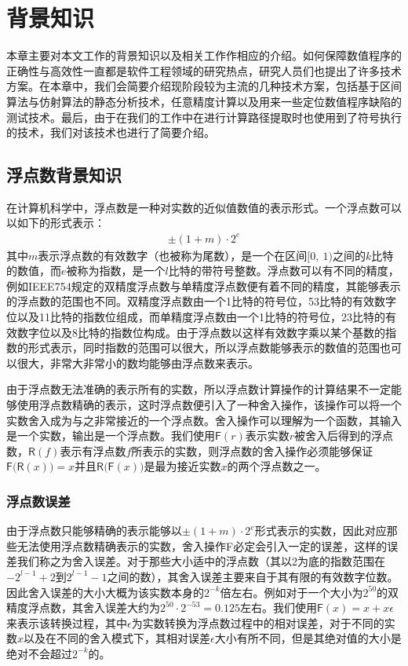 \chapter{背景知识}\label{chapter_background}

本章主要对本文工作的背景知识以及相关工作作相应的介绍。如何保障数值程序的正确性与高效性一直都是软件工程领域的研究热点，研究人员们也提出了许多技术方案。在本章中，我们会简要介绍现阶段较为主流的几种技术方案，包括基于区间算法与仿射算法的静态分析技术，任意精度计算以及用来一些定位数值程序缺陷的测试技术。最后，由于在我们的工作中在进行计算路径提取时也使用到了符号执行的技术，我们对该技术也进行了简要介绍。

\section{浮点数背景知识}

在计算机科学中，浮点数是一种对实数的近似值数值的表示形式。一个浮点数可以以如下的形式表示：
\begin{gather*}
    \pm (1+m) \cdot 2^e
\end{gather*}
其中$m$表示浮点数的有效数字（也被称为尾数），是一个在区间$[ 0 ,\ 1 )$之间的$k$比特的数值，而$e$被称为指数，是一个$l$比特的带符号整数。浮点数可以有不同的精度，例如IEEE754规定的双精度浮点数与单精度浮点数便有着不同的精度，其能够表示的浮点数的范围也不同。双精度浮点数由一个1比特的符号位，53比特的有效数字位以及11比特的指数位组成，而单精度浮点数由一个1比特的符号位，23比特的有效数字位以及8比特的指数位构成。由于浮点数以这样有效数字乘以某个基数的指数的形式表示，同时指数的范围可以很大，所以浮点数能够表示的数值的范围也可以很大，非常大非常小的数均能够由浮点数来表示。

由于浮点数无法准确的表示所有的实数，所以浮点数计算操作的计算结果不一定能够使用浮点数精确的表示，这时浮点数便引入了一种舍入操作，该操作可以将一个实数舍入成为与之非常接近的一个浮点数。舍入操作可以理解为一个函数，其输入是一个实数，输出是一个浮点数。我们使用$\mathsf{F}(r)$表示实数$r$被舍入后得到的浮点数，$\mathsf{R}(f)$表示有浮点数$f$所表示的实数，则浮点数的舍入操作必须能够保证$\mathsf{F(R}(x)) = x $并且$\mathsf{R(F}(x))$是最为接近实数$x$的两个浮点数之一。

\subsection{浮点数误差}

由于浮点数只能够精确的表示能够以$\pm(1+m) \cdot 2^e$形式表示的实数，因此对应那些无法使用浮点数精确表示的实数，舍入操作F必定会引入一定的误差，这样的误差我们称之为舍入误差。对于那些大小适中的浮点数（其以2为底的指数范围在$-2^{l-1}+2$到$2^{l-1}-1$之间的数），其舍入误差主要来自于其有限的有效数字位数。因此舍入误差的大小大概为该实数本身的$2^{-k}$倍左右。例如对于一个大小为$2^{50}$的双精度浮点数，其舍入误差大约为$2^{50} \cdot 2^{-53} = 0.125$左右。我们使用$\mathsf{F}(x) = x + x\epsilon$来表示该转换过程，其中$\epsilon$为实数转换为浮点数过程中的相对误差，对于不同的实数$x$以及在不同的舍入模式下，其相对误差$\epsilon$大小有所不同，但是其绝对值的大小是绝对不会超过$2^{-k}$的。


